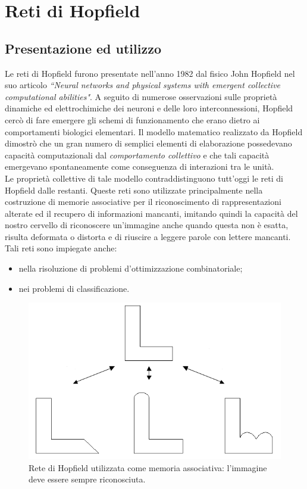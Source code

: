 \documentclass[12pt,a4paper,oneside]{book}
\begin{document}




	
\chapter{Reti di Hopfield}

	\section{Presentazione ed utilizzo}
	
	Le reti di Hopfield furono presentate nell'anno 1982 dal fisico John Hopfield nel suo articolo \textit{``Neural networks and physical systems with emergent collective computational abilities"}. A seguito di numerose osservazioni sulle proprietà dinamiche ed elettrochimiche dei neuroni e delle loro interconnessioni, Hopfield cercò di fare emergere gli schemi di funzionamento che erano dietro ai comportamenti biologici elementari. Il modello matematico realizzato da Hopfield dimostrò che un gran numero di semplici elementi di elaborazione possedevano capacità computazionali dal \emph{comportamento collettivo} e che tali capacità emergevano spontaneamente come conseguenza di interazioni tra le unità.\\
	Le proprietà collettive di tale modello contraddistinguono tutt'oggi le reti di Hopfield dalle restanti. Queste reti sono utilizzate principalmente nella costruzione di  memorie associative per il riconoscimento di rappresentazioni alterate ed il recupero di informazioni mancanti, imitando quindi la capacità del nostro cervello di riconoscere un'immagine anche quando questa non è esatta, risulta deformata o distorta e di riuscire a leggere parole con lettere mancanti.\\
	Tali reti sono impiegate anche:
	
	\begin{itemize}
		\item nella risoluzione di problemi d'ottimizzazione combinatoriale;
		\item nei problemi di classificazione.
	\end{itemize}

	\begin{figure}[h]
	\centering
	\includegraphics[width=0.55\linewidth]{IMMAGINI/riconoscimento}
	\caption{ Rete di Hopfield utilizzata come memoria associativa: l'immagine deve essere sempre riconosciuta.}
	\label{fig:riconoscimento}
	\end{figure}
\end{document}
